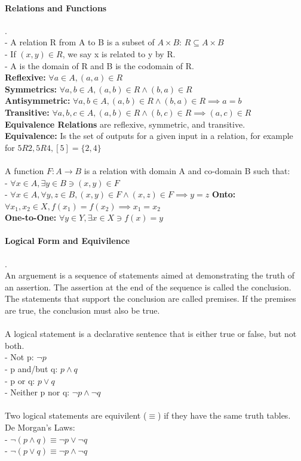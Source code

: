 \documentclass[10pt,letterpaper]{article}
\begin{document}
\begin{multicols}{2}
\paragraph*{Relations and Functions}.\\
- A relation R from A to B is a subset of $A \times B$: $R \subseteq A \times B$\\
- If $(x,y) \in R$, we say x is related to y by R.\\
- A is the domain of R and B is the codomain of R.\\
\textbf{Reflexive:} $\forall a \in A, (a,a) \in R$\\
\textbf{Symmetrics:} $\forall a,b \in A, (a,b) \in R \land (b,a) \in R$\\
\textbf{Antisymmetric:} $\forall a,b \in A, (a,b) \in R \land (b,a) \in R \implies a = b$\\
\textbf{Transitive:} $\forall a,b,c \in A, (a,b) \in R \land (b,c) \in R \implies (a,c) \in R$\\
\textbf{Equivalence Relations} are reflexive, symmetric, and transitive.\\
\textbf{Equivalence:} Is the set of outputs for a given input in a relation, for example for $5R2, 5R4, [5]=\{2,4\}$\\
\\
A function $F: A \rightarrow B$ is a relation with domain A and co-domain B such that:\\
- $\forall x \in A, \exists y \in B \ni (x,y) \in F$\\
- $\forall x \in A, \forall y,z \in B, (x,y) \in F \land (x,z) \in F \implies y=z$
\textbf{Onto:} $\forall x_1, x_2 \in X, f(x_1) = f(x_2) \implies x_1=x_2$\\
\textbf{One-to-One:} $\forall y \in Y, \exists x \in X \ni f(x) = y$\\

\paragraph*{Logical Form and Equivilence}.\\
An arguement is a sequence of statements aimed at demonstrating the truth of an assertion. The assertion at the end of the sequence is called the conclusion.
The statements that support the conclusion are called premises. If the premises are true, the conclusion must also be true.\\
\\
A logical statement is a declarative sentence that is either true or false, but not both.\\
- Not p: $\neg p$\\
- p and/but q: $p \land q$\\ 
- p or q: $p \lor q$\\
- Neither p nor q: $\neg p \land \neg q$\\
\\
Two logical statements are equivilent ($\equiv$) if they have the same truth tables.\\
De Morgan's Laws:\\
- $\neg(p \land q) \equiv \neg p \lor \neg q$\\
- $\neg(p \lor q) \equiv \neg p \land \neg q$


\end{multicols}
\end{document}
